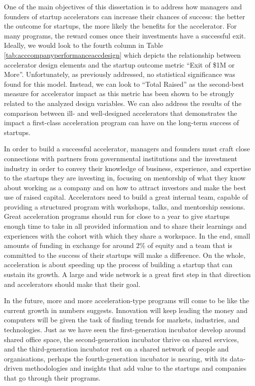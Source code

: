 \documentclass[
  12pt,
]{article}
\begin{document}
One of the main objectives of this dissertation is to address how managers and founders of startup accelerators can increase their chances of success: the better the outcome for startups, the more likely the benefits for the accelerator. For many programs, the reward comes once their investments have a successful exit. Ideally, we would look to the fourth column in Table \ref{tab:acccompanyperformanceaccdesign} which depicts the relationship between accelerator design elements and the startup outcome metric ``Exit of \$1M or More''. Unfortunately, as previously addressed, no statistical significance was found for this model. Instead, we can look to ``Total Raised'' as the second-best measure for accelerator impact as this metric has been shown to be strongly related to the analyzed design variables. We can also address the results of the comparison between ill- and well-designed accelerators that demonstrates the impact a first-class acceleration program can have on the long-term success of startups.

In order to build a successful accelerator, managers and founders must craft close connections with partners from governmental institutions and the investment industry in order to convey their knowledge of business, experience, and expertise to the startups they are investing in, focusing on mentorship of what they know about working as a company and on how to attract investors and make the best use of raised capital. Accelerators need to build a great internal team, capable of providing a structured program with workshops, talks, and mentorship sessions. Great acceleration programs should run for close to a year to give startups enough time to take in all provided information and to share their learnings and experiences with the cohort with which they share a workspace. In the end, small amounts of funding in exchange for around 2\% of equity and a team that is committed to the success of their startups will make a difference. On the whole, acceleration is about speeding up the process of building a startup that can sustain its growth. A large and wide network is a great first step in that direction and accelerators should make that their goal.

In the future, more and more acceleration-type programs will come to be like the current growth in numbers suggests. Innovation will keep leading the money and computers will be given the task of finding trends for markets, industries, and technologies. Just as we have seen the first-generation incubator develop around shared office space, the second-generation incubator thrive on shared services, and the third-generation incubator rest on a shared network of people and organisations, perhaps the fourth-generation incubator is nearing, with its data-driven methodologies and insights that add value to the startups and companies that go through their programs.
\end{document}
